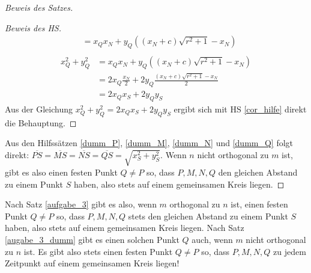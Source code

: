 \begin{proof}[Beweis des Satzes]
\begin{proof}[Beweis des HS]
\begin{align*}
            &=x_Qx_N+y_Q\left((x_N+c)\sqrt{r^2+1}-x_N\right)\\
        \end{align*}
        \begin{align*}
            x_Q^2+y_Q^2&=x_Qx_N+y_Q\left((x_N+c)\sqrt{r^2+1}-x_N\right)\\
            &=2x_Q\frac{x_N}{2}+2y_Q\frac{(x_N+c)\sqrt{r^2+1}-x_N}{2}\\
            &=2x_Qx_S+2y_Qy_S
        \end{align*}
        Aus der Gleichung $x_Q^2+y_Q^2=2x_Qx_S+2y_Qy_S$ ergibt sich mit HS \ref{cor_hilfe} direkt die Behauptung.
    \end{proof}
    Aus den Hilfssätzen \ref{dumm_P}, \ref{dumm_M}, \ref{dumm_N} und \ref{dumm_Q} folgt direkt: 
    $\overline{PS}=\overline{MS}=\overline{NS}=\overline{QS}=\sqrt{x_S^2+y_S^2}$. Wenn $n$ nicht orthogonal zu $m$ 
    ist, gibt es also einen festen Punkt $Q\neq P$ so, dass $P, M, N, Q$ den gleichen Abstand zu einem Punkt $S$ 
    haben, also stets auf einem gemeinsamen Kreis liegen.
    \renewcommand{\qedsymbol}{$\blacksquare$}
\end{proof}

Nach Satz \ref{aufgabe_3} gibt es also,  wenn $m$ orthogonal zu $n$ ist, einen festen Punkt $Q\neq P$ so, dass $P, M, 
N, Q$ stets den gleichen Abstand zu einem Punkt $S$ haben, also stets auf einem gemeinsamen Kreis liegen. 
Nach Satz \ref{augabe_3_dumm} gibt es einen solchen Punkt $Q$ auch, wenn $m$ nicht orthogonal zu $n$ ist. Es gibt 
also stets einen festen Punkt $Q\neq P$ so, dass $P, M, N, Q$ zu jedem Zeitpunkt auf einem gemeinsamen Kreis liegen!